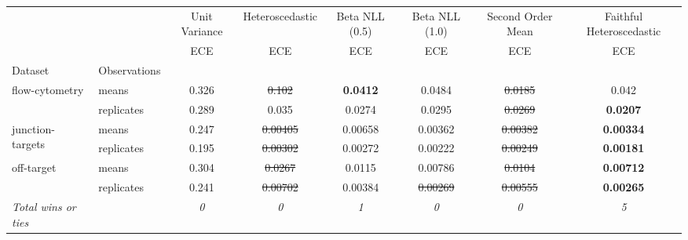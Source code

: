 \begin{tabular}{ll|c|c|c|c|c|c}
\toprule
{} & {} & {Unit Variance} & {Heteroscedastic} & {Beta NLL (0.5)} & {Beta NLL (1.0)} & {Second Order Mean} & {Faithful Heteroscedastic} \\
{} & {} & {ECE} & {ECE} & {ECE} & {ECE} & {ECE} & {ECE} \\
{Dataset} & {Observations} & {} & {} & {} & {} & {} & {} \\
\midrule
\multirow[t]{2}{*}{flow-cytometry} & means & 0.326 & \sout{0.102} & \textbf{0.0412} & 0.0484 & \sout{0.0185} & 0.042 \\
 & replicates & 0.289 & 0.035 & 0.0274 & 0.0295 & \sout{0.0269} & \textbf{0.0207} \\
\multirow[t]{2}{*}{junction-targets} & means & 0.247 & \sout{0.00405} & 0.00658 & 0.00362 & \sout{0.00382} & \textbf{0.00334} \\
 & replicates & 0.195 & \sout{0.00302} & 0.00272 & 0.00222 & \sout{0.00249} & \textbf{0.00181} \\
\multirow[t]{2}{*}{off-target} & means & 0.304 & \sout{0.0267} & 0.0115 & 0.00786 & \sout{0.0104} & \textbf{0.00712} \\
 & replicates & 0.241 & \sout{0.00702} & 0.00384 & \sout{0.00269} & \sout{0.00555} & \textbf{0.00265} \\
\textit{{Total wins or ties}} &  & \textit{0} & \textit{0} & \textit{1} & \textit{0} & \textit{0} & \textit{5} \\
\bottomrule
\end{tabular}
